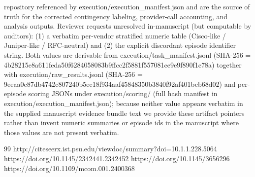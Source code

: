 \documentclass[conference]{IEEEtran}
\begin{document}
repository referenced by execution/execution\_manifest.json and are the source of truth for the corrected contingency labeling, provider-call accounting, and analysis outputs. Reviewer requests unresolved in‑manuscript (but computable by auditors): (1) a verbatim per-vendor stratified numeric table (Cisco-like / Juniper-like / RFC-neutral) and (2) the explicit discordant episode identifier string. Both values are derivable from execution/task\_manifest.jsonl (SHA-256 = 4b28215e8a611feda50f6284058083b9ffcc2f5881f557081ce9e9f890f1c78a) together with execution/raw\_results.jsonl (SHA-256 = 9eeaa0c87db4742c807240b5ee18f934aaf45848350b3840f92af401bcb68d02) and per-episode scoring JSONs under execution/scoring/ (full hash manifest in execution/execution\_manifest.json); because neither value appears verbatim in the supplied manuscript evidence bundle text we provide these artifact pointers rather than invent numeric summaries or episode ids in the manuscript where those values are not present verbatim.

\begin{thebibliography}{99}
 http://citeseerx.ist.psu.edu/viewdoc/summary?doi=10.1.1.228.5064
 https://doi.org/10.1145/2342441.2342452
 https://doi.org/10.1145/3656296
 https://doi.org/10.1109/mcom.001.2400368
\end{thebibliography}
\end{document}

